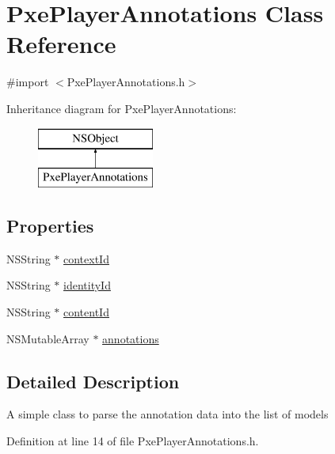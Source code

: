 \hypertarget{interface_pxe_player_annotations}{\section{Pxe\-Player\-Annotations Class Reference}
\label{interface_pxe_player_annotations}
}


{\ttfamily \#import $<$Pxe\-Player\-Annotations.\-h$>$}

Inheritance diagram for Pxe\-Player\-Annotations\-:\begin{figure}[H]
\begin{center}
\leavevmode
\includegraphics[height=2.000000cm]{interface_pxe_player_annotations}
\end{center}
\end{figure}
\subsection*{Properties}
\begin{DoxyCompactItemize}
\item 
N\-S\-String $\ast$ \hyperlink{interface_pxe_player_annotations_a038286be287dfb0f38f292e3b5ee99aa}{context\-Id}
\item 
N\-S\-String $\ast$ \hyperlink{interface_pxe_player_annotations_abb8ba4dd2ddc7e5a966cc21c716e5314}{identity\-Id}
\item 
N\-S\-String $\ast$ \hyperlink{interface_pxe_player_annotations_a84faed2ddf241cbf964d77750c508aab}{content\-Id}
\item 
N\-S\-Mutable\-Array $\ast$ \hyperlink{interface_pxe_player_annotations_a5ae9bd632e977e680f9093f2964d1cc9}{annotations}
\end{DoxyCompactItemize}


\subsection{Detailed Description}
A simple class to parse the annotation data into the list of models 

Definition at line 14 of file Pxe\-Player\-Annotations.\-h.



